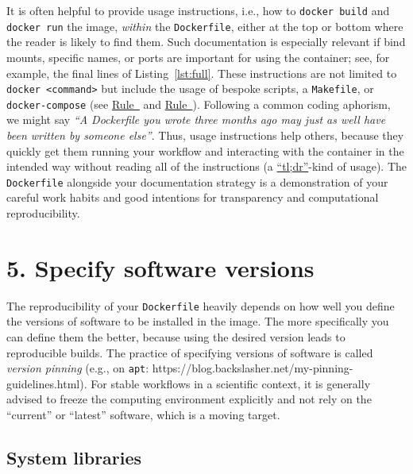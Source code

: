 \documentclass[10pt,letterpaper]{article}
\begin{document}
It is often helpful to provide usage instructions, i.e., how to
\texttt{docker\ build} and \texttt{docker\ run} the image, \emph{within}
the \texttt{Dockerfile}, either at the top or bottom where the reader is
likely to find them. Such documentation is especially relevant if bind
mounts, specific names, or ports are important for using the container;
see, for example, the final lines of Listing~\ref{lst:full}. These
instructions are not limited to
\texttt{docker\ \textless{}command\textgreater{}} but include the usage
of bespoke scripts, a \texttt{Makefile}, or \texttt{docker-compose} (see
\hyperref[{rule:interactive}]{Rule~} and
\hyperref[{rule:usage}]{Rule~}). Following a
common coding aphorism, we might say \emph{``A Dockerfile you wrote
three months ago may just as well have been written by someone else''}.
Thus, usage instructions help others, because they quickly get them
running your workflow and interacting with the container in the intended
way without reading all of the instructions (a
\href{https://en.wikipedia.org/wiki/Wikipedia:Too_long;_didn\%27t_read}{``tl;dr''}-kind
of usage). The \texttt{Dockerfile} alongside your documentation strategy
is a demonstration of your careful work habits and good intentions for
transparency and computational reproducibility.

\hypertarget{specify-software-versions}{%
\section*{5. Specify software
versions}\label{specify-software-versions}}

  \label{rule:pinning} 

The reproducibility of your \texttt{Dockerfile} heavily depends on how
well you define the versions of software to be installed in the image.
The more specifically you can define them the better, because using the
desired version leads to reproducible builds. The practice of specifying
versions of software is called \emph{version pinning} (e.g., on
\texttt{apt}: https://blog.backslasher.net/my-pinning-guidelines.html).
For stable workflows in a scientific context, it is generally advised to
freeze the computing environment explicitly and not rely on the
``current'' or ``latest'' software, which is a moving target.

\hypertarget{system-libraries}{%
\subsection{System libraries}\label{system-libraries}}
\end{document}
